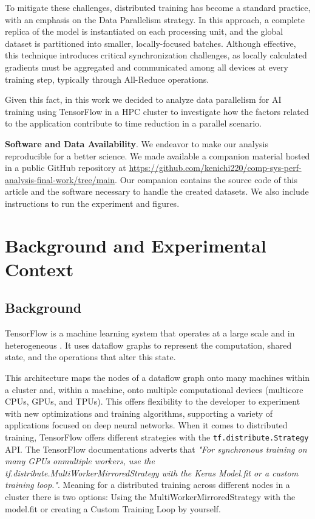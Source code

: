 \documentclass[12pt]{article}
\begin{document}
To mitigate these challenges, distributed training has become a
standard practice, with an emphasis on the Data Parallelism
strategy. In this approach, a complete replica of the model is
instantiated on each processing unit, and the global
dataset is partitioned into smaller, locally-focused batches. Although
effective, this technique introduces critical synchronization
challenges, as locally calculated gradients must be aggregated and
communicated among all devices at every training step, typically
through All-Reduce operations.

Given this fact, in this work we decided to analyze data parallelism
for AI training using TensorFlow in a HPC cluster to investigate how
the factors related to the application contribute to time reduction in
a parallel scenario.

\noindent
\textbf{Software and Data Availability}. We endeavor to make our analysis
reproducible for a better science. We made available a companion
material hosted in a public GitHub repository at
{\scriptsize\url{https://github.com/kenichi220/comp-sys-perf-analysis-final-work/tree/main}}.
Our companion contains the source code of this article and the
software necessary to handle the created datasets. We also include
instructions to run the experiment and figures.

\section{Background and Experimental Context}
\label{sec:orga898736}
\label{sec.context}
\subsection{Background}
\label{sec:org49b7513}
\label{sec.background}

TensorFlow is a machine learning system that operates at a large scale
and in heterogeneous \cite{tensorflow2016}. It uses dataflow graphs to
represent the computation, shared state, and the operations that alter
this state.

This architecture maps the nodes of a dataflow graph onto many
machines within a cluster and, within a machine, onto multiple
computational devices (multicore CPUs, GPUs, and TPUs). This offers
flexibility to the developer to experiment with new optimizations and
training algorithms, supporting a variety of applications focused on
deep neural networks. When it comes to distributed training, TensorFlow offers different
strategies with the \texttt{tf.distribute.Strategy} API. The TensorFlow
documentations adverts that \emph{"For synchronous training on many GPUs
onmultiple workers, use the tf.distribute.MultiWorkerMirroredStrategy with the Keras Model.fit or a custom training loop."}\cite{distributed}. Meaning for a
distributed training across different nodes in a cluster there is two
options: Using the MultiWorkerMirroredStrategy with the model.fit or
creating a Custom Training Loop by yourself.
\end{document}
